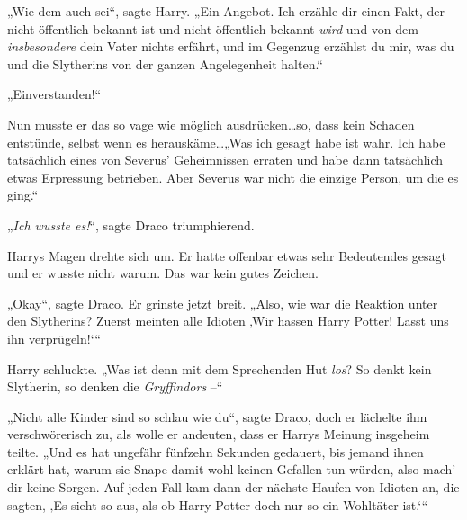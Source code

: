 „Wie dem auch sei“, sagte Harry. „Ein Angebot. Ich erzähle dir einen Fakt, der nicht öffentlich bekannt ist und nicht öffentlich bekannt \emph{wird} und von dem \emph{insbesondere} dein Vater nichts erfährt, und im Gegenzug erzählst du mir, was du und die Slytherins von der ganzen Angelegenheit halten.“

„Einverstanden!“

Nun musste er das so vage wie möglich ausdrücken…so, dass kein Schaden entstünde, selbst wenn es herauskäme…„Was ich gesagt habe ist wahr. Ich habe tatsächlich eines von Severus’ Geheimnissen erraten und habe dann tatsächlich etwas Erpressung betrieben. Aber Severus war nicht die einzige Person, um die es ging.“

„\emph{Ich wusste es!}“, sagte Draco triumphierend.

Harrys Magen drehte sich um. Er hatte offenbar etwas sehr Bedeutendes gesagt und er wusste nicht warum. Das war kein gutes Zeichen.

„Okay“, sagte Draco. Er grinste jetzt breit. „Also, wie war die Reaktion unter den Slytherins? Zuerst meinten alle Idioten ‚Wir hassen Harry Potter! Lasst uns ihn verprügeln!‘“

Harry schluckte. „Was ist denn mit dem Sprechenden Hut \emph{los}? So denkt kein Slytherin, so denken die \emph{Gryffindors} –“

„Nicht alle Kinder sind so schlau wie du“, sagte Draco, doch er lächelte ihm verschwörerisch zu, als wolle er andeuten, dass er Harrys Meinung insgeheim teilte. „Und es hat ungefähr fünfzehn Sekunden gedauert, bis jemand ihnen erklärt hat, warum sie Snape damit wohl keinen Gefallen tun würden, also mach’ dir keine Sorgen. Auf jeden Fall kam dann der nächste Haufen von Idioten an, die sagten, ‚Es sieht so aus, als ob Harry Potter doch nur so ein Wohltäter ist.‘“

